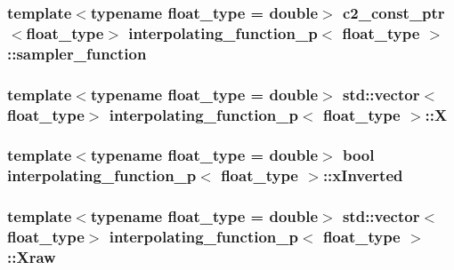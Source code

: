 \subsubsection[{\texorpdfstring{sampler\+\_\+function}{sampler_function}}]{\setlength{\rightskip}{0pt plus 5cm}template$<$typename float\+\_\+type = double$>$ {\bf c2\+\_\+const\+\_\+ptr}$<$float\+\_\+type$>$ {\bf interpolating\+\_\+function\+\_\+p}$<$ float\+\_\+type $>$\+::sampler\+\_\+function\hspace{0.3cm}{\ttfamily [protected]}}\hypertarget{classinterpolating__function__p_aa0c58578b4b40ec3f9154cb06d18764e}{}\label{classinterpolating__function__p_aa0c58578b4b40ec3f9154cb06d18764e}
\subsubsection[{\texorpdfstring{X}{X}}]{\setlength{\rightskip}{0pt plus 5cm}template$<$typename float\+\_\+type = double$>$ std\+::vector$<$float\+\_\+type$>$ {\bf interpolating\+\_\+function\+\_\+p}$<$ float\+\_\+type $>$\+::X\hspace{0.3cm}{\ttfamily [protected]}}\hypertarget{classinterpolating__function__p_a2ae94315914ef71afb6e9f84f8383e61}{}\label{classinterpolating__function__p_a2ae94315914ef71afb6e9f84f8383e61}
\subsubsection[{\texorpdfstring{x\+Inverted}{xInverted}}]{\setlength{\rightskip}{0pt plus 5cm}template$<$typename float\+\_\+type = double$>$ bool {\bf interpolating\+\_\+function\+\_\+p}$<$ float\+\_\+type $>$\+::x\+Inverted\hspace{0.3cm}{\ttfamily [protected]}}\hypertarget{classinterpolating__function__p_a2eaaea5d2083d93d0a8d4825a9f5bbfe}{}\label{classinterpolating__function__p_a2eaaea5d2083d93d0a8d4825a9f5bbfe}
\subsubsection[{\texorpdfstring{Xraw}{Xraw}}]{\setlength{\rightskip}{0pt plus 5cm}template$<$typename float\+\_\+type = double$>$ std\+::vector$<$float\+\_\+type$>$ {\bf interpolating\+\_\+function\+\_\+p}$<$ float\+\_\+type $>$\+::Xraw\hspace{0.3cm}{\ttfamily [protected]}}\hypertarget{classinterpolating__function__p_acd71560b0fc125d028847ad906207a62}{}\label{classinterpolating__function__p_acd71560b0fc125d028847ad906207a62}
